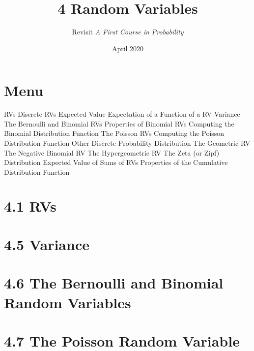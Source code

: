 \documentclass{article}
\title{4 Random Variables}
\author{Revisit \emph{A First Course in Probability}}
\date{April 2020}
\begin{document}
\maketitle

\section*{Menu}
\begin{outline}[enumerate]
    \1  RVs
    \1  Discrete RVs
    \1  Expected Value
    \1  Expectation of a Function of a RV
    \1  Variance
    \1  The Bernoulli and Binomial RVs
        \2 Properties of Binomial RVs
        \2 Computing the Binomial Distribution Function
    \1  The Poisson RVs 
        \2 Computing the Poisson Distribution Function
    \1  Other Discrete Probability Distribution
        \2 The Geometric RV
        \2 The Negative Binomial RV
        \2 The Hypergeometric RV
        \2 The Zeta (or Zipf) Distribution 
    \1  Expected Value of Sums of RVs
    \1  Properties of the Cumulative Distribution Function 
\end{outline}


\section*{4.1 RVs}
\section*{4.5 Variance}
\section*{4.6 The Bernoulli and Binomial Random Variables}
\section*{4.7 The Poisson Random Variable}





\end{document}
